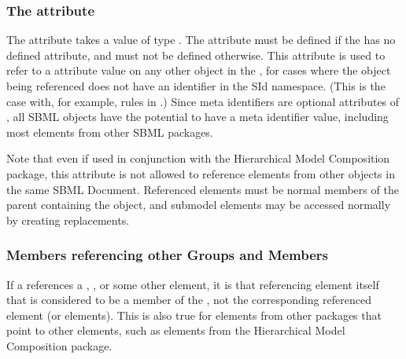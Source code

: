 \subsubsection{The \fixttspace{} attribute}
\label{member-metaidref-attribute}

The \Member attribute  takes a value of type .  The attribute must be defined if the \Member has no defined  attribute, and must not be defined otherwise.  This attribute is used to refer to a  attribute value on any other object in the \Model, for cases where the object being referenced does not have an identifier in the \Model SId namespace.  (This is the case with, for example, rules in \sbmlthreecore.)  Since meta identifiers are optional attributes of \SBase, all SBML objects have the potential to have a meta identifier value, including most elements from other SBML packages.

Note that even if used in conjunction with the Hierarchical Model Composition package, this attribute is not allowed to reference elements from other \Model objects in the same SBML Document.  Referenced elements must be normal members of the parent \Model containing the \Member object, and submodel elements may be accessed normally by creating replacements.


\subsubsection{Members referencing other Groups and Members}
\label{nested-groups}

If a \Member references a \Group, \ListOfMembers, or some other \Member element, it is that referencing element itself that is considered to be a member of the \Group, not the corresponding referenced element (or elements).  This is also true for elements from other packages that point to other elements, such as \SBaseRef elements from the Hierarchical Model Composition package.

